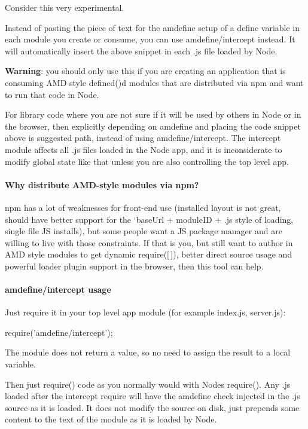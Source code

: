 Consider this very experimental.

Instead of pasting the piece of text for the amdefine setup of a {\ttfamily define} variable in each module you create or consume, you can use {\ttfamily amdefine/intercept} instead. It will automatically insert the above snippet in each .js file loaded by Node.

{\bfseries Warning}\+: you should only use this if you are creating an application that is consuming A\+MD style defined()\textquotesingle{}d modules that are distributed via npm and want to run that code in Node.

For library code where you are not sure if it will be used by others in Node or in the browser, then explicitly depending on amdefine and placing the code snippet above is suggested path, instead of using {\ttfamily amdefine/intercept}. The intercept module affects all .js files loaded in the Node app, and it is inconsiderate to modify global state like that unless you are also controlling the top level app.

\paragraph*{Why distribute A\+M\+D-\/style modules via npm?}

npm has a lot of weaknesses for front-\/end use (installed layout is not great, should have better support for the `base\+Url + module\+ID + \textquotesingle{}.js\textquotesingle{} style of loading, single file JS installs), but some people want a JS package manager and are willing to live with those constraints. If that is you, but still want to author in A\+MD style modules to get dynamic require(\mbox{[}$\,$\mbox{]}), better direct source usage and powerful loader plugin support in the browser, then this tool can help.

\paragraph*{amdefine/intercept usage}

Just require it in your top level app module (for example index.\+js, server.\+js)\+:


\begin{DoxyCode}
require('amdefine/intercept');
\end{DoxyCode}


The module does not return a value, so no need to assign the result to a local variable.

Then just require() code as you normally would with Node\textquotesingle{}s require(). Any .js loaded after the intercept require will have the amdefine check injected in the .js source as it is loaded. It does not modify the source on disk, just prepends some content to the text of the module as it is loaded by Node.

